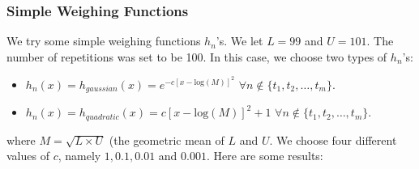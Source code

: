 \documentclass{article}
\begin{document}
\subsubsection{Simple Weighing Functions}
We try some simple weighing functions $h_{n}$'s. We let $L = 99$ and $U = 101$. The number of repetitions was set to be 100. In this case, we choose two types of $h_{n}$'s:
\begin{itemize}
\item $h_{n}(x) = h_{gaussian}(x) = e^{-c[x - \text{log}(M)]^{2}}$ $\forall n \notin \{ t_{1}, t_{2}, \ldots, t_{m} \}$.
\item $h_{n}(x) = h_{quadratic}(x) = c[x - \text{log}(M)]^{2} + 1 $ $\forall n \notin \{ t_{1}, t_{2}, \ldots, t_{m} \}$.
\end{itemize}
where $M = \sqrt{L \times U}$ (the geometric mean of $L$ and $U$. We choose four different values of $c$, namely $1, 0.1, 0.01$ and $0.001$. Here are some results:
\end{document}
